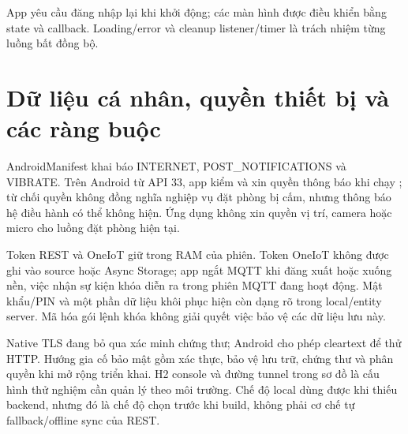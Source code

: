 App yêu cầu đăng nhập lại khi khởi động; các màn hình được điều khiển bằng state và callback. Loading/error và cleanup listener/timer là trách nhiệm từng luồng bất đồng bộ.

\FloatBarrier
\section{Dữ liệu cá nhân, quyền thiết bị và các ràng buộc}
AndroidManifest khai báo INTERNET, POST\_NOTIFICATIONS và VIBRATE. Trên Android từ API 33, app kiểm và xin quyền thông báo khi chạy \cite{android}; từ chối quyền không đồng nghĩa nghiệp vụ đặt phòng bị cấm, nhưng thông báo hệ điều hành có thể không hiện. Ứng dụng không xin quyền vị trí, camera hoặc micro cho luồng đặt phòng hiện tại.

Token REST và OneIoT giữ trong RAM của phiên. Token OneIoT không được ghi vào source hoặc Async Storage; app ngắt MQTT khi đăng xuất hoặc xuống nền, việc nhận sự kiện khóa diễn ra trong phiên MQTT đang hoạt động. Mật khẩu/PIN và một phần dữ liệu khôi phục hiện còn dạng rõ trong local/entity server. Mã hóa gói lệnh khóa không giải quyết việc bảo vệ các dữ liệu lưu này.

Native TLS đang bỏ qua xác minh chứng thư; Android cho phép cleartext để thử HTTP. Hướng gia cố bảo mật gồm xác thực, bảo vệ lưu trữ, chứng thư và phân quyền khi mở rộng triển khai. H2 console và đường tunnel trong sơ đồ là cấu hình thử nghiệm cần quản lý theo môi trường. Chế độ local dùng được khi thiếu backend, nhưng đó là chế độ chọn trước khi build, không phải cơ chế tự fallback/offline sync của REST.


